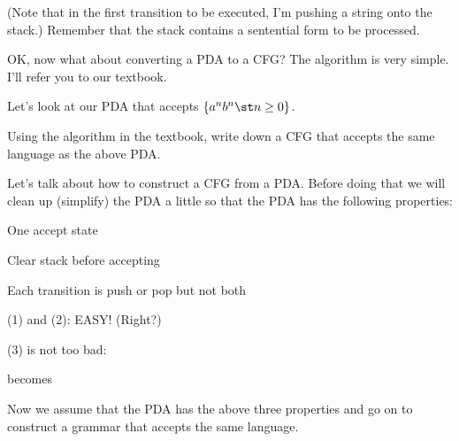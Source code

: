 (Note that in the first transition to be executed, I'm pushing a string onto
the stack.)
Remember that the stack contains a sentential form to be processed.



\newpage
OK, now what about converting a PDA to a CFG?
The algorithm is very simple.
I'll refer you to our textbook.

\begin{eg}
Let's look at our PDA that accepts $\{a^n b^n \st n \geq 0\}$.
\begin{center}

\end{center}
Using the algorithm in the textbook, write down a CFG that accepts the same
language as the above PDA.
\end{eg}


Let's talk about how to construct a CFG from a PDA.
Before doing that we will clean up (simplify) the PDA a little so that
the PDA has the following properties:
\begin{mylist}
 \item[(1)] One accept state
 \item[(2)] Clear stack before accepting
 \item[(3)] Each transition is push or pop but not both
\end{mylist}
(1) and (2): EASY! (Right?)

(3) is not too bad:

becomes


Now we assume that the PDA has the above three properties and go on
to construct a grammar that accepts the same language.

